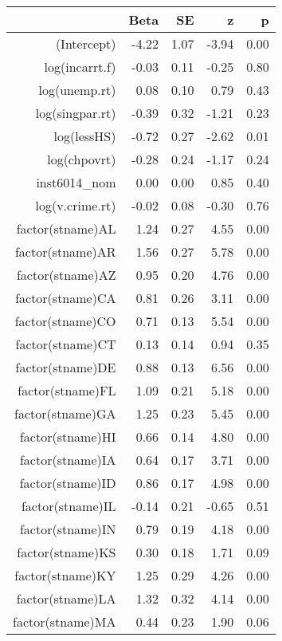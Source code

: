 \begin{table}[ht]
\centering
\begin{tabular}{rrrrr}
  \hline
 & Beta & SE & z & p \\ 
  \hline
(Intercept) & -4.22 & 1.07 & -3.94 & 0.00 \\ 
  log(incarrt.f) & -0.03 & 0.11 & -0.25 & 0.80 \\ 
  log(unemp.rt) & 0.08 & 0.10 & 0.79 & 0.43 \\ 
  log(singpar.rt) & -0.39 & 0.32 & -1.21 & 0.23 \\ 
  log(lessHS) & -0.72 & 0.27 & -2.62 & 0.01 \\ 
  log(chpovrt) & -0.28 & 0.24 & -1.17 & 0.24 \\ 
  inst6014\_nom & 0.00 & 0.00 & 0.85 & 0.40 \\ 
  log(v.crime.rt) & -0.02 & 0.08 & -0.30 & 0.76 \\ 
  factor(stname)AL & 1.24 & 0.27 & 4.55 & 0.00 \\ 
  factor(stname)AR & 1.56 & 0.27 & 5.78 & 0.00 \\ 
  factor(stname)AZ & 0.95 & 0.20 & 4.76 & 0.00 \\ 
  factor(stname)CA & 0.81 & 0.26 & 3.11 & 0.00 \\ 
  factor(stname)CO & 0.71 & 0.13 & 5.54 & 0.00 \\ 
  factor(stname)CT & 0.13 & 0.14 & 0.94 & 0.35 \\ 
  factor(stname)DE & 0.88 & 0.13 & 6.56 & 0.00 \\ 
  factor(stname)FL & 1.09 & 0.21 & 5.18 & 0.00 \\ 
  factor(stname)GA & 1.25 & 0.23 & 5.45 & 0.00 \\ 
  factor(stname)HI & 0.66 & 0.14 & 4.80 & 0.00 \\ 
  factor(stname)IA & 0.64 & 0.17 & 3.71 & 0.00 \\ 
  factor(stname)ID & 0.86 & 0.17 & 4.98 & 0.00 \\ 
  factor(stname)IL & -0.14 & 0.21 & -0.65 & 0.51 \\ 
  factor(stname)IN & 0.79 & 0.19 & 4.18 & 0.00 \\ 
  factor(stname)KS & 0.30 & 0.18 & 1.71 & 0.09 \\ 
  factor(stname)KY & 1.25 & 0.29 & 4.26 & 0.00 \\ 
  factor(stname)LA & 1.32 & 0.32 & 4.14 & 0.00 \\ 
  factor(stname)MA & 0.44 & 0.23 & 1.90 & 0.06 \\ 

\end{tabular}
\end{table}
